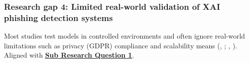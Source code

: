 
\subsubsection*{Research gap 4: Limited real-world validation of XAI phishing detection systems}\label{research-gap-4}
Most studies test models in controlled environments and often ignore real-world limitations such as privacy (GDPR) compliance and scalability means (\citeauthor{kapoor2024comparative}, \citeyear{kapoor2024comparative}; \citeauthor{atlam2022business}, \citeyear{atlam2022business}). Aligned with \hyperref[sub-research-q1]{\uline{\textbf{Sub Research Question 1}}}.
